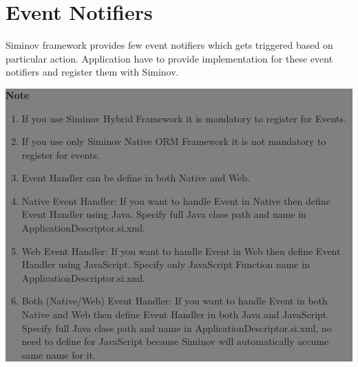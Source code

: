 \newpage
\chapter {\Large{Event Notifiers}}

Siminov framework provides few event notifiers which gets triggered based on particular action. Application have to provide implementation for these event notifiers and register them with Siminov.

	\begin{center}
		\colorbox{grey}{
			\parbox[t]{.8\linewidth}{
			\fontsize{11pt}{11pt}\selectfont %
			\vspace*{0.1cm} %
		
			\hfill \textbf{Note} \\
				
				\begin{enumerate}

					\item \small If you use Siminov Hybrid Framework it is mandatory to register for Events.

					\item \small If you use only Siminov Native ORM Framework it is not mandatory to register for events.

					\item \small Event Handler can be define in both Native and Web.

					\item \small Native Event Handler: If you want to handle Event in Native then define Event Handler using Java. Specify full Java class path and name in ApplicationDescriptor.si.xml.

					\item \small Web Event Handler: If you want to handle Event in Web then define Event Handler using JavaScript. Specify only JavaScript Function name in ApplicationDescriptor.si.xml.

					\item \small Both (Native/Web) Event Handler: If you want to handle Event in both Native and Web then define Event Handler in both Java and JavaScript. Specify full Java class path and name in ApplicationDescriptor.si.xml, no need to define for JavaScript because Siminov will automatically accume same name for it.
	
				\end{enumerate}
				
			\vspace*{0.0cm} %
			}
		}

	\end{center}





